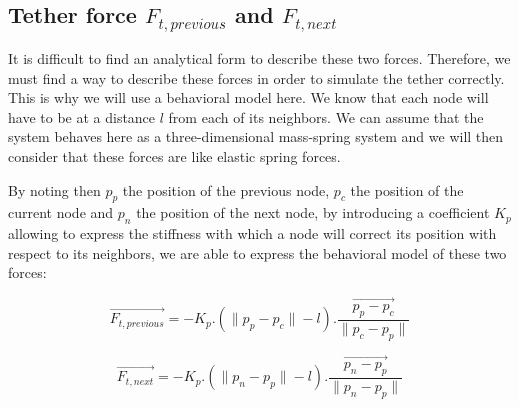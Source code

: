 \subsection{Tether force $F_{t, previous}$ and $F_{t, next}$}

It is difficult to find an analytical form to describe these two forces. Therefore, we must find a way to describe these forces in order to simulate the tether correctly. This is why we will use a behavioral model here. We know that each node will have to be at a distance $l$ from each of its neighbors. We can assume that the system behaves here as a three-dimensional mass-spring system and we will then consider that these forces are like elastic spring forces.

By noting then $p_{p}$ the position of the previous node, $p_{c}$ the position of the current node and $p_{n}$ the position of the next node, by introducing a coefficient $K_p$ allowing to express the stiffness with which a node will correct its position with respect to its neighbors, we are able to express the behavioral model of these two forces:

$$\overrightarrow{F_{t, previous}} = -K_p.\left(\|p_p - p_c\| - l\right).\frac{\overrightarrow{p_p - p_c}}{\|p_c - p_p\|}$$

$$\overrightarrow{F_{t, next}} = -K_p.\left(\|p_n - p_p\| - l\right).\frac{\overrightarrow{p_n - p_p}}{\|p_n - p_p\|}$$
